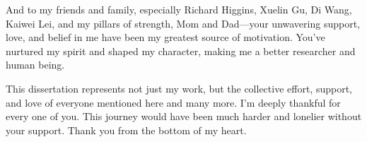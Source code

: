 And to my friends and family, especially Richard Higgins, Xuelin Gu, Di Wang, Kaiwei Lei, and my pillars of strength, Mom and Dad—your unwavering support, love, and belief in me have been my greatest source of motivation. You've nurtured my spirit and shaped my character, making me a better researcher and human being.

This dissertation represents not just my work, but the collective effort, support, and love of everyone mentioned here and many more. I'm deeply thankful for every one of you. This journey would have been much harder and lonelier without your support. Thank you from the bottom of my heart.